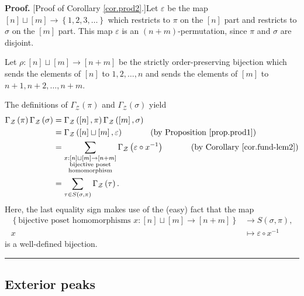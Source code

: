 \documentclass[numbers=enddot,12pt,final,onecolumn,notitlepage]{scrartcl}%
\theoremstyle{definition}
\newenvironment{proof}[1][Proof]{\noindent\textbf{#1.} }{\ \rule{0.5em}{0.5em}}
\let\sumnonlimits\sum
\renewcommand{\sum}{\sumnonlimits\limits}
\begin{document}
\begin{proof}
[Proof of Corollary \ref{cor.prod2}.]Let $\varepsilon$ be the map $\left[
n\right]  \sqcup\left[  m\right]  \rightarrow\left\{  1,2,3,\ldots\right\}  $
which restricts to $\pi$ on the $\left[  n\right]  $ part and restricts to
$\sigma$ on the $\left[  m\right]  $ part. This map $\varepsilon$ is an
$\left(  n+m\right)  $-permutation, since $\pi$ and $\sigma$ are disjoint.

Let $\rho:\left[  n\right]  \sqcup\left[  m\right]  \rightarrow\left[
n+m\right]  $ be the strictly order-preserving bijection which sends the
elements of $\left[  n\right]  $ to $1,2,\ldots,n$ and sends the elements of
$\left[  m\right]  $ to $n+1,n+2,\ldots,n+m$.

The definitions of $\Gamma_{\mathcal{Z}}\left(  \pi\right)  $ and
$\Gamma_{\mathcal{Z}}\left(  \sigma\right)  $ yield%
\begin{align*}
\Gamma_{\mathcal{Z}}\left(  \pi\right)  \Gamma_{\mathcal{Z}}\left(
\sigma\right)   &  =\Gamma_{\mathcal{Z}}\left(  \left[  n\right]  ,\pi\right)
\Gamma_{\mathcal{Z}}\left(  \left[  m\right]  ,\sigma\right) \\
&  =\Gamma_{\mathcal{Z}}\left(  \left[  n\right]  \sqcup\left[  m\right]
,\varepsilon\right)  \ \ \ \ \ \ \ \ \ \ \left(  \text{by Proposition
\ref{prop.prod1}}\right) \\
&  =\sum_{\substack{x:\left[  n\right]  \sqcup\left[  m\right]  \rightarrow
\left[  n+m\right]  \\\text{bijective poset}\\\text{homomorphism}}%
}\Gamma_{\mathcal{Z}}\left(  \varepsilon\circ x^{-1}\right)
\ \ \ \ \ \ \ \ \ \ \left(  \text{by Corollary \ref{cor.fund-lem2}}\right) \\
&  =\sum_{\tau\in S\left(  \sigma,\pi\right)  }\Gamma_{\mathcal{Z}}\left(
\tau\right)  .
\end{align*}
Here, the last equality sign makes use of the (easy) fact that the map%
\begin{align*}
\left\{  \text{bijective poset homomorphisms }x:\left[  n\right]
\sqcup\left[  m\right]  \rightarrow\left[  n+m\right]  \right\}   &
\rightarrow S\left(  \sigma,\pi\right)  ,\\
x  &  \mapsto\varepsilon\circ x^{-1}%
\end{align*}
is a well-defined bijection.
\end{proof}

\subsection{Exterior peaks}
\end{document}
